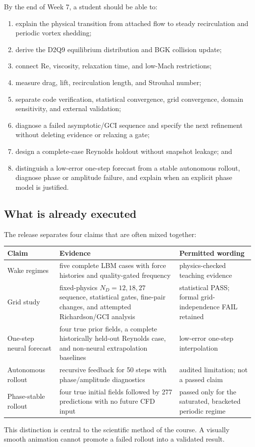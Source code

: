 \documentclass[11pt]{article}
\newcommand{\Rey}{\mathrm{Re}}
\begin{document}
\begin{learningbox}
By the end of Week 7, a student should be able to:
\begin{enumerate}
\item explain the physical transition from attached flow to steady recirculation and periodic vortex shedding;
\item derive the D2Q9 equilibrium distribution and BGK collision update;
\item connect $\Rey$, viscosity, relaxation time, and low-Mach restrictions;
\item measure drag, lift, recirculation length, and Strouhal number;
\item separate code verification, statistical convergence, grid convergence,
domain sensitivity, and external validation;
\item diagnose a failed asymptotic/GCI sequence and specify the next refinement
without deleting evidence or relaxing a gate;
\item design a complete-case Reynolds holdout without snapshot leakage; and
\item distinguish a low-error one-step forecast from a stable autonomous
rollout, diagnose phase or amplitude failure, and explain when an explicit
phase model is justified.
\end{enumerate}
\end{learningbox}

\subsection{What is already executed}
The release separates four claims that are often mixed together:
\begin{center}
\begin{tabular}{p{}p{}p{}}
\toprule
Claim & Evidence & Permitted wording \\
\midrule
Wake regimes & five complete LBM cases with force histories and quality-gated frequency & physics-checked teaching evidence \\
Grid study & fixed-physics $N_D=12,18,27$ sequence, statistical gates, fine-pair changes, and attempted Richardson/GCI analysis & statistical PASS; formal grid-independence FAIL retained \\
One-step neural forecast & four true prior fields, a complete historically held-out Reynolds case, and non-neural extrapolation baselines & low-error one-step interpolation \\
Autonomous rollout & recursive feedback for 50 steps with phase/amplitude diagnostics & audited limitation; not a passed claim \\
Phase-stable rollout & four true initial fields followed by 277 predictions with no future CFD input & passed only for the saturated, bracketed periodic regime \\
\bottomrule
\end{tabular}
\end{center}
This distinction is central to the scientific method of the course. A visually
smooth animation cannot promote a failed rollout into a validated result.
\end{document}
